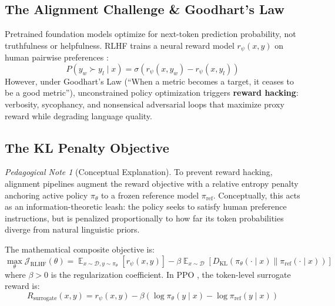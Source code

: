 \documentclass[11pt,a4paper]{article}
\theoremstyle{definition}
\theoremstyle{plain}
\theoremstyle{remark}
\newtheorem*{pedagogynote}{Pedagogical Note}
\DeclareMathOperator{\E}{\mathbb{E}}
\newcommand{\KL}[2]{D_{\mathrm{KL}}\left(#1 \parallel #2\right)}
\begin{document}
\subsection{The Alignment Challenge \& Goodhart's Law}
Pretrained foundation models optimize for next-token prediction probability, not truthfulness or helpfulness. RLHF trains a neural reward model $r_\psi(x, y)$ on human pairwise preferences \cite{ouyang2022training}:
\begin{equation}
P(y_w \succ y_l \mid x) = \sigma(r_\psi(x, y_w) - r_\psi(x, y_l))
\end{equation}
However, under Goodhart's Law (``When a metric becomes a target, it ceases to be a good metric''), unconstrained policy optimization triggers \textbf{reward hacking}: verbosity, sycophancy, and nonsensical adversarial loops that maximize proxy reward while degrading language quality.

\subsection{The KL Penalty Objective}
\begin{pedagogynote}[Conceptual Explanation]
To prevent reward hacking, alignment pipelines augment the reward objective with a relative entropy penalty anchoring active policy $\pi_\theta$ to a frozen reference model $\pi_{\mathrm{ref}}$. Conceptually, this acts as an information-theoretic leash: the policy seeks to satisfy human preference instructions, but is penalized proportionally to how far its token probabilities diverge from natural linguistic priors.
\end{pedagogynote}

The mathematical composite objective is:
\begin{equation}
\max_\theta \mathcal{J}_{\mathrm{RLHF}}(\theta) = \E_{x \sim \mathcal{D}, y \sim \pi_\theta} [r_\psi(x, y)] - \beta \E_{x \sim \mathcal{D}} [\KL{\pi_\theta(\cdot \mid x)}{\pi_{\mathrm{ref}}(\cdot \mid x)}]
\end{equation}
where $\beta > 0$ is the regularization coefficient.
In PPO \cite{schulman2017proximal}, the token-level surrogate reward is:
\begin{equation}
R_{\mathrm{surrogate}}(x, y) = r_\psi(x, y) - \beta \left( \log \pi_\theta(y \mid x) - \log \pi_{\mathrm{ref}}(y \mid x) \right)
\end{equation}
\end{document}
